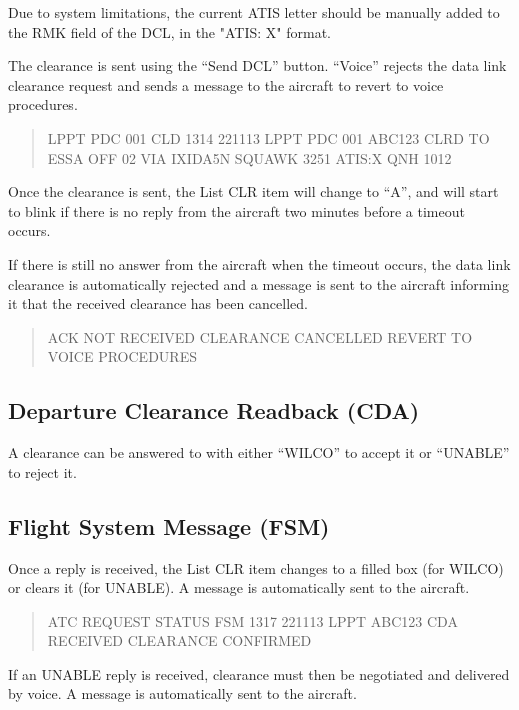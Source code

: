 \documentclass[11pt,a4paper]{memoir}
\newenvironment{Note}
  {\begin{shaded}\marginnote{\fbox{Note}}}
  {\end{shaded}}
\begin{document}
\begin{Note}
  Due to system limitations, the current ATIS letter should be manually added to the RMK field of the DCL, in the "ATIS: X" format.
\end{Note}

The clearance is sent using the “Send DCL” button. “Voice” rejects the data link clearance request and sends a message to the aircraft to revert to voice procedures. 

\begin{quote}
  LPPT PDC 001 CLD 1314 221113 LPPT PDC 001 ABC123 CLRD TO ESSA OFF 02 VIA IXIDA5N SQUAWK 3251 ATIS:X QNH 1012
\end{quote}

Once the clearance is sent, the List CLR item will change to “A”, and will start to blink if there is no reply from the aircraft two minutes before a timeout occurs.

If there is still no answer from the aircraft when the timeout occurs, the data link clearance is automatically rejected and a message is sent to the aircraft informing it that the received clearance has been cancelled.

\begin{quote}
  ACK NOT RECEIVED CLEARANCE CANCELLED REVERT TO VOICE PROCEDURES
\end{quote}

\subsection*{Departure Clearance Readback (CDA)}

A clearance can be answered to with either “WILCO” to accept it or “UNABLE” to reject it.

\subsection*{Flight System Message (FSM)}

Once a reply is received, the List CLR item changes to a filled box (for WILCO) or clears it (for UNABLE). A message is automatically sent to the aircraft.

\begin{quote}
  ATC REQUEST STATUS FSM 1317 221113 LPPT ABC123 CDA RECEIVED CLEARANCE CONFIRMED 
\end{quote}

If an UNABLE reply is received, clearance must then be negotiated and delivered by voice. A message is automatically sent to the aircraft.
\end{document}
